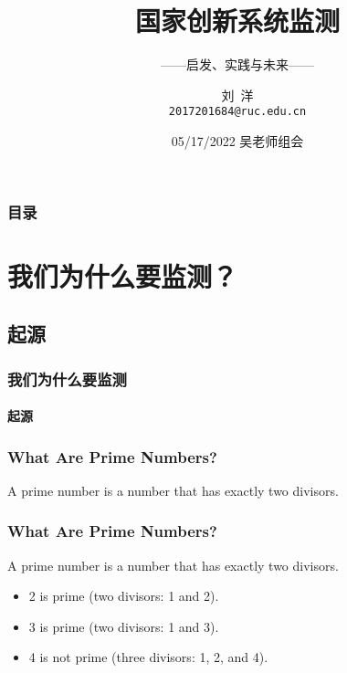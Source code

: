 \documentclass[t,aspectratio=54]{beamer}
\title{国家创新系统监测}
\subtitle{——启发、实践与未来——}
\author[Yang]{刘\ 洋 \\ \texttt{2017201684@ruc.edu.cn}}
\date[Labmeeting]{05/17/2022 吴老师组会}
\begin{document}
    \begin{frame}
        \titlepage
    \end{frame}

    \begin{frame}
        \frametitle{目录}
        \tableofcontents[pausesections]
    \end{frame}

    \section{我们为什么要监测？}
		\subsection{起源}
    \begin{frame}
			\frametitle{我们为什么要监测}
			\framesubtitle{起源}
    \end{frame}  

    \begin{frame}
        \frametitle{What Are Prime Numbers?}
        \begin{definition}
          A \alert{prime number} is a number that has exactly two divisors.
        \end{definition}
    \end{frame}

    \begin{frame}
        \frametitle{What Are Prime Numbers?}
        \begin{definition}
          A \alert{prime number} is a number that has exactly two divisors.
        \end{definition}
        \begin{example}
            \begin{itemize}
                \item 2 is prime (two divisors: 1 and 2).
                  \pause
                \item 3 is prime (two divisors: 1 and 3).
                  \pause
                \item 4 is not prime (\alert{three} divisors: 1, 2, and 4).
            \end{itemize}
        \end{example}
    \end{frame}
\end{document}
